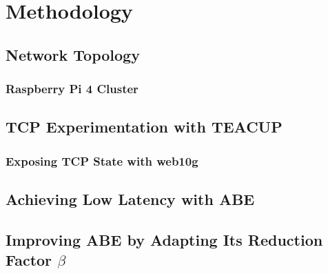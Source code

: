 \chapter{Methodology}


\section{Network Topology}

\subsection{Raspberry Pi 4 Cluster}



\section{TCP Experimentation with TEACUP}

\subsection{Exposing TCP State with web10g}


\section{Achieving Low Latency with ABE}



\section{Improving ABE by Adapting Its Reduction Factor \texorpdfstring{$\beta$}{}}